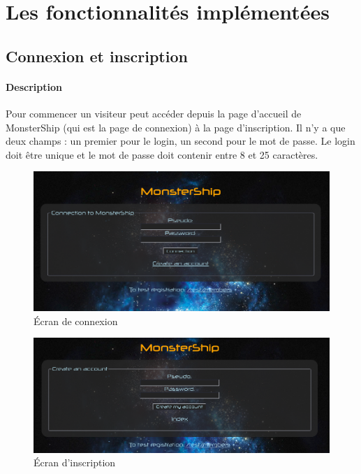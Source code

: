\documentclass[a4paper,11pt]{report}
\begin{document}
  \section{Les fonctionnalités implémentées}

    \subsection{Connexion et inscription}
  
      \paragraph{Description}
        Pour commencer un visiteur peut accéder depuis la page d'accueil de MonsterShip (qui est la page de connexion) à la page d'inscription. Il n'y a que deux champs : un premier pour le login, un second pour le mot de passe. Le login doit être unique et le mot de passe doit contenir entre 8 et 25 caractères.
        \begin{figure}[H]
          \begin{center}
            \includegraphics[width=.8\textwidth]{images/connexion.png}
            \caption{Écran de connexion}
            \label{fig:ec_co}
          \end{center}
        \end{figure}
        \begin{figure}[H]
          \begin{center}
            \includegraphics[width=.8\textwidth]{images/inscription.png}
            \caption{Écran d'inscription}
            \label{fig:ec_inc}
          \end{center}
        \end{figure}
        
\end{document}
